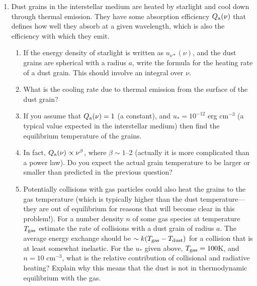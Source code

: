 \documentclass[11pt, preprint]{article}
\begin{document}
\begin{enumerate}
\item Dust grains in the interstellar medium are heated by starlight
  and cool down through thermal emission.  They have some absorption
  efficiency $Q_{\rm a}(\nu)$ that defines how well they absorb at a
  given wavelength, which is also the efficiency with which they emit.
  \begin{enumerate}
  \item If the energy density of starlight is written as
    $u_{\nu\ast}(\nu)$, and the dust grains are spherical with a
    radius $a$, write the formula for the heating rate of a dust
    grain. This should involve an integral over $\nu$.
  \item What is the cooling rate due to thermal emission from the
    surface of the dust grain?
  \item If you assume that $Q_{\rm a}(\nu) =1$ (a constant), and
    $u_\ast = 10^{-12}$ erg cm$^{-3}$ (a typical value expected in the
    interstellar medium) then find the equilibrium temperature of the
    grains.
  \item In fact, $Q_{\rm a}(\nu) \propto \nu^{\beta}$, where
    $\beta\sim 1$--2 (actually it is more complicated than a power
    law). Do you expect the actual grain temperature to be larger or
    smaller than predicted in the previous question?
  \item Potentially collisions with gas particles could also heat the
    grains to the gas temperature (which is typically higher than the
    dust temperature---they are out of equilibrium for reasons that
    will become clear in this problem!). For a number density $n$ of
    some gas species at temperature $T_{\rm gas}$ estimate the rate of
    collisions with a dust grain of radius $a$. The average energy
    exchange should be $\sim k(T_{\rm gas} - T_{\rm dust})$ for a
    collision that is at least somewhat inelastic.  For the $u_\ast$
    given above, $T_{\rm gas} = 100$K, and $n=10$ cm$^{-3}$, what is
    the relative contribution of collisional and radiative heating?
    Explain why this means that the dust is not in thermodynamic
    equilibrium with the gas.
  \end{enumerate}

\end{enumerate}
\end{document}
